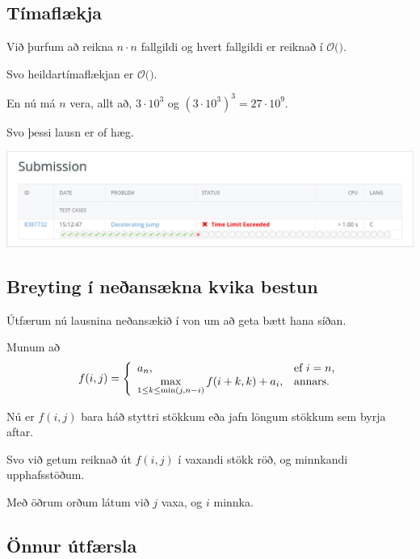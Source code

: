 \subsection{Tímaflækja}
{
    {
        \item<1-> Við þurfum að reikna $n \cdot n$ fallgildi og hvert fallgildi er reiknað í $\mathcal{O}($$)$.
        \item<3-> Svo heildartímaflækjan er $\mathcal{O}($$)$.
        \item<5-> En nú má $n$ vera, allt að, $3 \cdot 10^3$ og $(3 \cdot 10^3)^3 = 27 \cdot 10^9$.
        \item<6-> Svo þessi lausn er of hæg.
        \item<7->[] \includegraphics[scale = 0.25]{fig/tle1.png}
    }
}

\subsection{Breyting í neðansækna kvika bestun}
{
    {
        \item<1-> Útfærum nú lausnina neðansækið í von um að geta bætt hana síðan.
        \item<2-> Munum að
        \[
            f(i, j) = 
            \left \{
            \env{array}
            {
                {l l}
                a_n, & \text{ef $i = n$},\\
                \max\limits_{1 \leq k \leq \min(j, n - i)} f(i + k, k) + a_i, & \text{annars}.
            }
            \right .
        \]
        \item<3-> Nú er $f(i, j)$ bara háð styttri stökkum eða jafn löngum stökkum sem byrja aftar.
        \item<4-> Svo við getum reiknað út $f(i, j)$ í vaxandi stökk röð, og minnkandi upphafsstöðum.
        \item<5-> Með öðrum orðum látum við $j$ vaxa, og $i$ minnka.
    }
}

\subsection{Önnur útfærsla}
{
}

